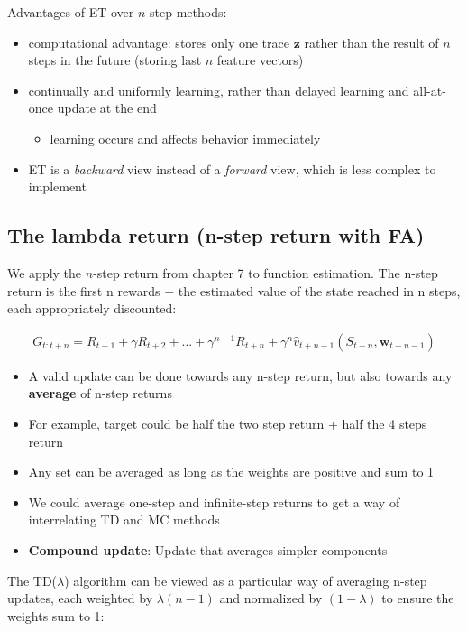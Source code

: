 \documentclass[sutton_barto_notes.tex]{subfiles}
\begin{document}
Advantages of ET over $n$-step methods: 
\begin{itemize}
\item computational advantage: stores only one trace $\mathbf{z}$ rather than the result of $n$ steps in the future (storing last $n$ feature vectors)
\item continually and uniformly learning, rather than delayed learning and all-at-once update at the end
\begin{itemize}
	\item learning occurs and affects behavior immediately
\end{itemize}
\item ET is a \textit{backward} view instead of a \textit{forward} view, which is less complex to implement 
\end{itemize}

\subsection{The lambda return (n-step return with FA)}

 We apply the $n$-step return from chapter 7 to function estimation. The n-step return is the first n rewards + the estimated value of the state reached in n steps, each appropriately discounted: 

\begin{align}
G_{t:t+n} = R_{t+1} + \gamma R_{t+2} + ... + \gamma^{n-1} R_{t+n} + \gamma^n \hat{v}_{t+n-1}(S_{t+n}, \mathbf{w}_{t+n-1}) \label{eq:12.1}\tag{12.1}
\end{align}

\begin{itemize}
\item A valid update can be done towards any n-step return, but also towards any \textbf{average} of n-step returns 
\item For example, target could be half the two step return + half the 4 steps return 
\item Any set can be averaged as long as the weights are positive and sum to 1 
\item We could average one-step and infinite-step returns to get a way of interrelating TD and MC methods 
\item \textbf{Compound update}: Update that averages simpler components 
\end{itemize}

 The TD($\lambda$) algorithm can be viewed as a particular way of averaging n-step updates, each weighted by $\lambda{(n-1)}$ and normalized by $(1 - \lambda)$ to ensure the weights sum to 1: 
\end{document}
